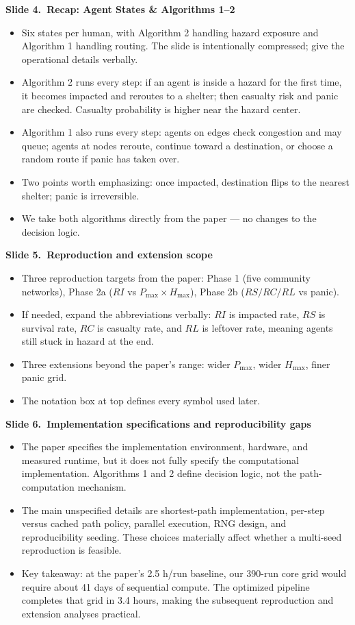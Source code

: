 \documentclass[11pt]{article}
\newcommand{\slide}[2]{\vspace{0.6em}\noindent\textbf{Slide #1.\ #2}\par\nopagebreak\vspace{0.1em}}
\begin{document}
\slide{4}{Recap: Agent States \& Algorithms 1--2}
\begin{itemize}
\item Six states per human, with Algorithm 2 handling hazard exposure and Algorithm 1 handling routing. The slide is intentionally compressed; give the operational details verbally.
\item Algorithm 2 runs every step: if an agent is inside a hazard for the first time, it becomes impacted and reroutes to a shelter; then casualty risk and panic are checked. Casualty probability is higher near the hazard center.
\item Algorithm 1 also runs every step: agents on edges check congestion and may queue; agents at nodes reroute, continue toward a destination, or choose a random route if panic has taken over.
\item Two points worth emphasizing: once impacted, destination flips to the nearest shelter; panic is irreversible.
\item We take both algorithms directly from the paper --- no changes to the decision logic.
\end{itemize}

\slide{5}{Reproduction and extension scope}
\begin{itemize}
\item Three reproduction targets from the paper: Phase 1 (five community networks), Phase 2a ($RI$ vs $P_{\max} \times H_{\max}$), Phase 2b ($RS/RC/RL$ vs panic).
\item If needed, expand the abbreviations verbally: $RI$ is impacted rate, $RS$ is survival rate, $RC$ is casualty rate, and $RL$ is leftover rate, meaning agents still stuck in hazard at the end.
\item Three extensions beyond the paper's range: wider $P_{\max}$, wider $H_{\max}$, finer panic grid.
\item The notation box at top defines every symbol used later.
\end{itemize}

\slide{6}{Implementation specifications and reproducibility gaps}
\begin{itemize}
\item The paper specifies the implementation environment, hardware, and measured runtime, but it does not fully specify the computational implementation. Algorithms 1 and 2 define decision logic, not the path-computation mechanism.
\item The main unspecified details are shortest-path implementation, per-step versus cached path policy, parallel execution, RNG design, and reproducibility seeding. These choices materially affect whether a multi-seed reproduction is feasible.
\item Key takeaway: at the paper's 2.5 h/run baseline, our 390-run core grid would require about 41 days of sequential compute. The optimized pipeline completes that grid in 3.4 hours, making the subsequent reproduction and extension analyses practical.
\end{itemize}
\end{document}
